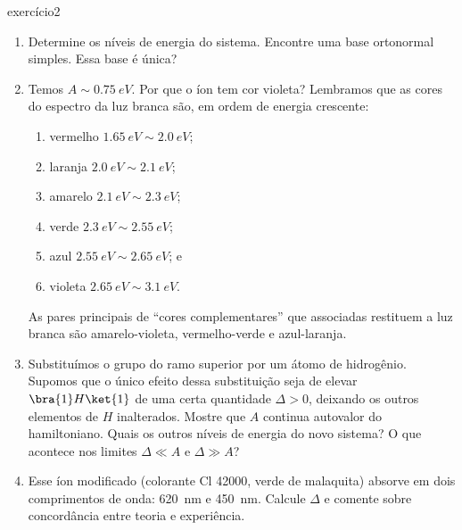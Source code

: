 \begin{exercício}{}{exercício2}
\begin{enumerate}[label=(\alph*)]
        \item Determine os níveis de energia do sistema. Encontre uma base ortonormal simples. Essa base é única?
    \item Temos \(A \sim \SI{0.75}{eV}.\) Por que o íon tem cor violeta? Lembramos que as cores do espectro da luz branca são, em ordem de energia crescente:
        \begin{enumerate}[label=(\roman*)]
            \item vermelho \(\SI{1.65}{eV} \sim \SI{2.0}{eV}\);
            \item laranja \(\SI{2.0}{eV} \sim \SI{2.1}{eV}\);
            \item amarelo \(\SI{2.1}{eV} \sim \SI{2.3}{eV}\);
            \item verde \(\SI{2.3}{eV} \sim \SI{2.55}{eV}\);
            \item azul \(\SI{2.55}{eV} \sim \SI{2.65}{eV}\); e
            \item violeta \(\SI{2.65}{eV} \sim \SI{3.1}{eV}\).
        \end{enumerate}
        As pares principais de \enquote{cores complementares} que associadas restituem a luz branca são amarelo-violeta, vermelho-verde e azul-laranja.
    \item Substituímos o grupo  do ramo superior por um átomo de hidrogênio. Supomos que o único efeito dessa substituição seja de elevar \(\bra{1}H\ket{1}\) de uma certa quantidade \(\Delta > 0\), deixando os outros elementos de \(H\) inalterados. Mostre que \(A\) continua autovalor do hamiltoniano. Quais os outros níveis de energia do novo sistema? O que acontece nos limites \(\Delta \ll A\) e \(\Delta \gg A\)?
    \item Esse íon modificado (colorante Cl 42000, verde de malaquita) absorve em dois comprimentos de onda: \SI{620}{nm} e \SI{450}{nm}. Calcule \(\Delta\) e comente sobre concordância entre teoria e experiência.
    \end{enumerate}
\end{exercício}
